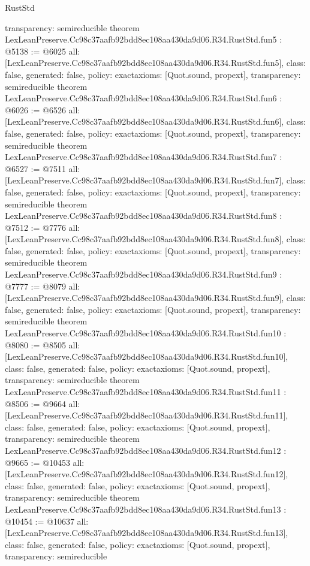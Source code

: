 \begin{lexlean}{RustStd}
\begin{coremodule}
{  transparency: semireducible
}
theorem LexLeanPreserve.Cc98c37aafb92bdd8ec108aa430da9d06.R34.RustStd.fun5 : @5138 := @6025 {
  all: [LexLeanPreserve.Cc98c37aafb92bdd8ec108aa430da9d06.R34.RustStd.fun5],
  class: false,
  generated: false,
  policy: exact{axioms: [Quot.sound, propext]},
  transparency: semireducible
}
theorem LexLeanPreserve.Cc98c37aafb92bdd8ec108aa430da9d06.R34.RustStd.fun6 : @6026 := @6526 {
  all: [LexLeanPreserve.Cc98c37aafb92bdd8ec108aa430da9d06.R34.RustStd.fun6],
  class: false,
  generated: false,
  policy: exact{axioms: [Quot.sound, propext]},
  transparency: semireducible
}
theorem LexLeanPreserve.Cc98c37aafb92bdd8ec108aa430da9d06.R34.RustStd.fun7 : @6527 := @7511 {
  all: [LexLeanPreserve.Cc98c37aafb92bdd8ec108aa430da9d06.R34.RustStd.fun7],
  class: false,
  generated: false,
  policy: exact{axioms: [Quot.sound, propext]},
  transparency: semireducible
}
theorem LexLeanPreserve.Cc98c37aafb92bdd8ec108aa430da9d06.R34.RustStd.fun8 : @7512 := @7776 {
  all: [LexLeanPreserve.Cc98c37aafb92bdd8ec108aa430da9d06.R34.RustStd.fun8],
  class: false,
  generated: false,
  policy: exact{axioms: [Quot.sound, propext]},
  transparency: semireducible
}
theorem LexLeanPreserve.Cc98c37aafb92bdd8ec108aa430da9d06.R34.RustStd.fun9 : @7777 := @8079 {
  all: [LexLeanPreserve.Cc98c37aafb92bdd8ec108aa430da9d06.R34.RustStd.fun9],
  class: false,
  generated: false,
  policy: exact{axioms: [Quot.sound, propext]},
  transparency: semireducible
}
theorem LexLeanPreserve.Cc98c37aafb92bdd8ec108aa430da9d06.R34.RustStd.fun10 : @8080 := @8505 {
  all: [LexLeanPreserve.Cc98c37aafb92bdd8ec108aa430da9d06.R34.RustStd.fun10],
  class: false,
  generated: false,
  policy: exact{axioms: [Quot.sound, propext]},
  transparency: semireducible
}
theorem LexLeanPreserve.Cc98c37aafb92bdd8ec108aa430da9d06.R34.RustStd.fun11 : @8506 := @9664 {
  all: [LexLeanPreserve.Cc98c37aafb92bdd8ec108aa430da9d06.R34.RustStd.fun11],
  class: false,
  generated: false,
  policy: exact{axioms: [Quot.sound, propext]},
  transparency: semireducible
}
theorem LexLeanPreserve.Cc98c37aafb92bdd8ec108aa430da9d06.R34.RustStd.fun12 : @9665 := @10453 {
  all: [LexLeanPreserve.Cc98c37aafb92bdd8ec108aa430da9d06.R34.RustStd.fun12],
  class: false,
  generated: false,
  policy: exact{axioms: [Quot.sound, propext]},
  transparency: semireducible
}
theorem LexLeanPreserve.Cc98c37aafb92bdd8ec108aa430da9d06.R34.RustStd.fun13 : @10454 := @10637 {
  all: [LexLeanPreserve.Cc98c37aafb92bdd8ec108aa430da9d06.R34.RustStd.fun13],
  class: false,
  generated: false,
  policy: exact{axioms: [Quot.sound, propext]},
  transparency: semireducible
}
\end{coremodule}
\end{lexlean}

